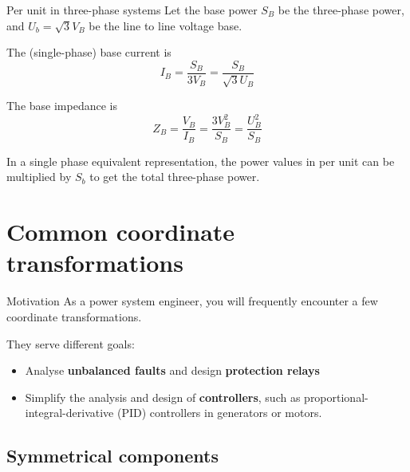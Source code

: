 \begin{frame}{Per unit in three-phase systems}
    Let the base power $S_B$ be the three-phase power, and $U_b=\sqrt{3}V_B$ be the line to line voltage base.

    The (single-phase) base current is $$I_B = \frac{S_B}{3V_B} = \frac{S_B}{\sqrt{3}U_B}$$

    The base impedance is $$Z_B = \frac{V_B}{I_B} = \frac{3V^2_B}{S_B} = \frac{U_B^2}{S_B}$$

    In a single phase equivalent representation, the power values in per unit can be multiplied by $S_b$ to get the total three-phase power.
\end{frame}
  

\section{Common coordinate transformations}

\begin{frame}{Motivation}
    As a power system engineer, you will frequently encounter a few coordinate transformations.

    They serve different goals:
    \begin{itemize}
        \item Analyse \textbf{unbalanced faults} and design \textbf{protection relays}
        \item Simplify the analysis and design of \textbf{controllers}, such as proportional-integral-derivative (PID) controllers in generators or motors.
    \end{itemize}

\end{frame}

\subsection{Symmetrical components}

